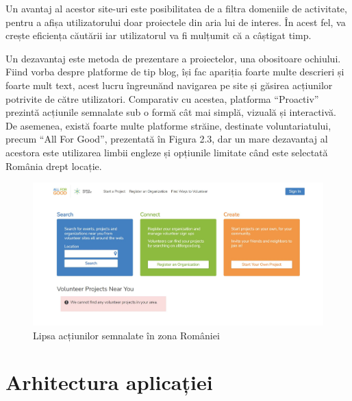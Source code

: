 \documentclass[12pt,a4paper]{report}
\begin{document}
\par
Un avantaj al acestor site-uri este posibilitatea de a filtra domeniile de activitate, pentru a afișa utilizatorului doar proiectele din aria lui de interes. În acest fel, va crește eficiența căutării iar utilizatorul va fi mulțumit că a câștigat timp.
\\\par 
Un dezavantaj este metoda de prezentare a proiectelor, una obositoare ochiului. Fiind vorba despre platforme de tip blog, își fac apariția foarte multe descrieri și foarte mult text, acest lucru îngreunănd navigarea pe site și găsirea acțiunilor potrivite de către utilizatori. Comparativ cu acestea, platforma “Proactiv” prezintă acțiunile semnalate sub o formă cât mai simplă, vizuală și interactivă.
\newpage
De asemenea, există foarte multe platforme străine, destinate voluntariatului, precum “All For Good”\cite{afg}, prezentată în Figura 2.3, dar un mare dezavantaj al acestora este utilizarea limbii engleze și opțiunile limitate când este selectată România drept locație.
\begin{figure}[H]
\centering
  \includegraphics[width=1\linewidth]{./imagini/afg.jpg}
  \caption{Lipsa acțiunilor semnalate în zona României}
\end{figure}


\chapter{Arhitectura aplicației}
\end{document}
